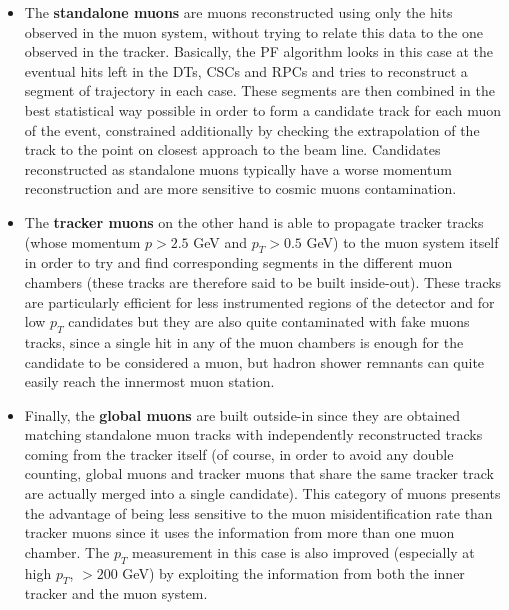 \documentclass[a4paper, 10pt, openright]{report}
\begin{document}
\begin{itemize}
\item The \textbf{standalone muons} are muons reconstructed using only the hits observed in the muon system, without trying to relate this data to the one observed in the tracker. Basically, the \ac{PF} algorithm looks in this case at the eventual hits left in the \acp{DT}, \acp{CSC} and \acp{RPC} and tries to reconstruct a segment of trajectory in each case. These segments are then combined in the best statistical way possible in order to form a candidate track for each muon of the event, constrained additionally by checking the extrapolation of the track to the point on closest approach to the beam line. Candidates reconstructed as standalone muons typically have a worse momentum reconstruction and are more sensitive to cosmic muons contamination. %
\item The \textbf{tracker muons} on the other hand is able to propagate tracker tracks (whose momentum $p > 2.5$ GeV and $p_T > 0.5$ GeV) to the muon system itself in order to try and find corresponding segments in the different muon chambers (these tracks are therefore said to be built inside-out).  These tracks are particularly efficient for less instrumented regions of the detector and for low $p_T$ candidates but they are also quite contaminated with fake muons tracks, since a single hit in any of the muon chambers is enough for the candidate to be considered a muon, but hadron shower remnants can quite easily reach the innermost muon station.
\item Finally, the \textbf{global muons} are built outside-in since they are obtained matching standalone muon tracks with independently reconstructed tracks coming from the tracker itself (of course, in order to avoid any double counting, global muons and tracker muons that share the same tracker track are actually merged into a single candidate). This category of muons presents the advantage of being less sensitive to the muon misidentification rate than tracker muons since it uses the information from more than one muon chamber. The $p_T$ measurement in this case is also improved (especially at high $p_T$, $> 200$ GeV) by exploiting the information from both the inner tracker and the muon system.
\end{itemize}
\end{document}
